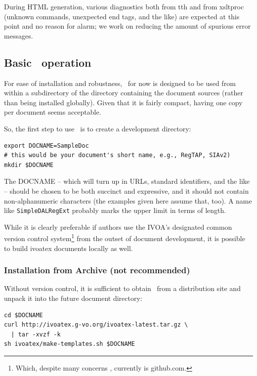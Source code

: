 \documentclass[11pt,a4paper]{ivoa}
\begin{document}
During HTML generation, various diagnostics both
from tth and from xsltproc (unknown commands,
unexpected end tags, and the like) are
expected at this point and no reason for alarm; we work on reducing the
amount of spurious error messages.

\subsection{Basic \ivoatex~operation}

For ease of installation and robustness, \ivoatex\ for now is designed
to be used from within a subdirectory of the directory containing the
document sources (rather than being installed globally).  Given that
it is fairly compact, having one copy per document seems acceptable.

So, the first step to use \ivoatex\ is to create a development
directory:

\begin{lstlisting}
export DOCNAME=SampleDoc
# this would be your document's short name, e.g., RegTAP, SIAv2)
mkdir $DOCNAME
\end{lstlisting}

The DOCNAME -- which will turn up in URLs, standard identifiers, and the
like -- should be chosen to be both succinct and expressive, and it
should not contain non-alphanumeric characters (the examples given here
assume that, too).  A name
like \texttt{SimpleDALRegExt} probably marks the upper limit in terms of
length.

While it is clearly preferable if authors use the IVOA's
designated common version control system\footnote{Which, despite
many concerns \citep{book:zuboff}, currently is
github.com.} from the outset of
document development, it is possible to build ivoatex documents
locally as well.

\subsubsection{Installation from Archive (not recommended)}

Without version control, it is sufficient to obtain \ivoatex\ from a
distribution site and unpack it into the future document directory:

\begin{lstlisting}
cd $DOCNAME
curl http://ivoatex.g-vo.org/ivoatex-latest.tar.gz \
  | tar -xvzf -k
sh ivoatex/make-templates.sh $DOCNAME
\end{lstlisting}
\end{document}
